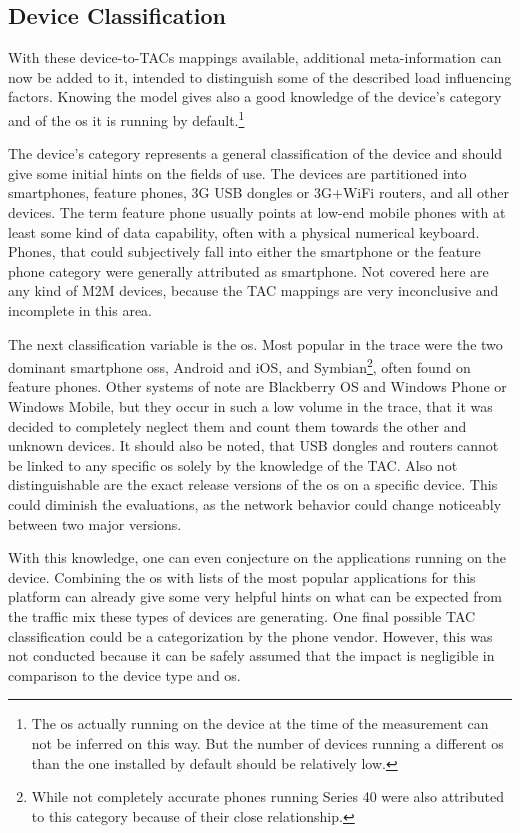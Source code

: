 \subsection{Device Classification}

With these device-to-\glspl{TAC} mappings available, additional meta-information can now be added to it, intended to distinguish some of the described load influencing factors. Knowing the model gives also a good knowledge of the device's category and of the \gls{os} it is running by default.\footnote{The \gls{os} actually running on the device at the time of the measurement can not be inferred on this way. But the number of devices running a different \gls{os} than the one installed by default should be relatively low.}

The device's category represents a general classification of the device and should give some initial hints on the fields of use. The devices are partitioned into smartphones, feature phones, \gls{3G} USB dongles or \gls{3G}+WiFi routers, and all other devices. The term feature phone usually points at low-end mobile phones with at least some kind of data capability, often with a physical numerical keyboard. Phones, that could subjectively fall into either the smartphone or the feature phone category were generally attributed as smartphone. Not covered here are any kind of \gls{M2M} devices, because the \gls{TAC} mappings are very inconclusive and incomplete in this area.

The next classification variable is the \gls{os}. Most popular in the trace were the two dominant smartphone \glspl{os}, Android and iOS, and Symbian\footnote{While not completely accurate phones running Series 40 were also attributed to this category because of their close relationship.}, often found on feature phones. Other systems of note are Blackberry OS and Windows Phone or Windows Mobile, but they occur in such a low volume in the trace, that it was decided to completely neglect them and count them towards the other and unknown devices. It should also be noted, that USB dongles and routers cannot be linked to any specific \gls{os} solely by the knowledge of the \gls{TAC}. Also not distinguishable are the exact release versions of the \gls{os} on a specific device. This could diminish the evaluations, as the network behavior could change noticeably between two major versions.

With this knowledge, one can even conjecture on the applications running on the device. Combining the \gls{os} with lists of the most popular applications for this platform can already give some very helpful hints on what can be expected from the traffic mix these types of devices are generating. One final possible \gls{TAC} classification could be a categorization by the phone vendor. However, this was not conducted because it can be safely assumed that the impact is negligible in comparison to the device type and \gls{os}.


